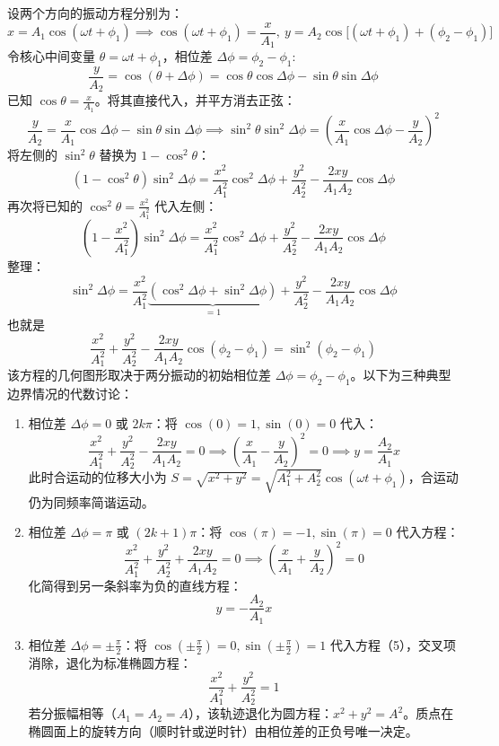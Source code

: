 \documentclass[lang=cn,11pt]{elegantbook}
\begin{document}
设两个方向的振动方程分别为：\[x = A_1 \cos(\omega t + \phi_1) \implies \cos(\omega t + \phi_1) = \frac{x}{A_1},~y = A_2 \cos\big[ (\omega t + \phi_1) + (\phi_2 - \phi_1) \big]\]
令核心中间变量 $\theta = \omega t + \phi_1$，相位差 $\Delta \phi = \phi_2 - \phi_1$:
$$\frac{y}{A_2} = \cos(\theta + \Delta \phi)= \cos\theta \cos\Delta \phi - \sin\theta \sin\Delta \phi $$
已知 $\cos\theta = \frac{x}{A_1}$。将其直接代入，并平方消去正弦：
$$\frac{y}{A_2} = \frac{x}{A_1} \cos\Delta \phi - \sin\theta \sin\Delta \phi\implies\sin^2\theta \sin^2\Delta \phi = \left( \frac{x}{A_1} \cos\Delta \phi - \frac{y}{A_2} \right)^2$$
将左侧的 $\sin^2\theta$ 替换为 $1 - \cos^2\theta$：
$$(1 - \cos^2\theta) \sin^2\Delta \phi = \frac{x^2}{A_1^2} \cos^2\Delta \phi + \frac{y^2}{A_2^2} - \frac{2xy}{A_1 A_2} \cos\Delta \phi$$再次将已知的 $\cos^2\theta = \frac{x^2}{A_1^2}$ 代入左侧：$$\left( 1 - \frac{x^2}{A_1^2} \right) \sin^2\Delta \phi = \frac{x^2}{A_1^2} \cos^2\Delta \phi + \frac{y^2}{A_2^2} - \frac{2xy}{A_1 A_2} \cos\Delta \phi$$整理：$$\sin^2\Delta \phi = \frac{x^2}{A_1^2} \underbrace{\left( \cos^2\Delta \phi + \sin^2\Delta \phi \right)}_{=1} + \frac{y^2}{A_2^2} - \frac{2xy}{A_1 A_2} \cos\Delta \phi$$也就是$$\boxed{\frac{x^2}{A_1^2} + \frac{y^2}{A_2^2} - \frac{2xy}{A_1 A_2} \cos(\phi_2 - \phi_1) = \sin^2(\phi_2 - \phi_1)}$$
该方程的几何图形取决于两分振动的初始相位差 $\Delta \phi = \phi_2 - \phi_1$。以下为三种典型边界情况的代数讨论：
\begin{enumerate}
    \item 相位差 $\Delta \phi = 0$ 或 $2k\pi$：将 $\cos(0) = 1, \sin(0) = 0$ 代入：$$\frac{x^2}{A_1^2} + \frac{y^2}{A_2^2} - \frac{2xy}{A_1 A_2} = 0 \implies \left( \frac{x}{A_1} - \frac{y}{A_2} \right)^2 = 0\implies y = \frac{A_2}{A_1} x$$此时合运动的位移大小为 $S = \sqrt{x^2 + y^2} = \sqrt{A_1^2 + A_2^2} \cos(\omega t + \phi_1)$，合运动仍为同频率简谐运动。
    \item 相位差 $\Delta \phi = \pi$ 或 $(2k+1)\pi$：将 $\cos(\pi) = -1, \sin(\pi) = 0$ 代入方程：$$\frac{x^2}{A_1^2} + \frac{y^2}{A_2^2} + \frac{2xy}{A_1 A_2} = 0 \implies \left( \frac{x}{A_1} + \frac{y}{A_2} \right)^2 = 0$$化简得到另一条斜率为负的直线方程：$$y = -\frac{A_2}{A_1} x$$
    \item 相位差 $\Delta \phi = \pm \frac{\pi}{2}$：将 $\cos\left(\pm\frac{\pi}{2}\right) = 0, \sin\left(\pm\frac{\pi}{2}\right) = 1$ 代入方程（5），交叉项消除，退化为标准椭圆方程：$$\frac{x^2}{A_1^2} + \frac{y^2}{A_2^2} = 1$$若分振幅相等（$A_1 = A_2 = A$），该轨迹退化为圆方程：$x^2 + y^2 = A^2$。质点在椭圆面上的旋转方向（顺时针或逆时针）由相位差的正负号唯一决定。
\end{enumerate}
\end{document}
